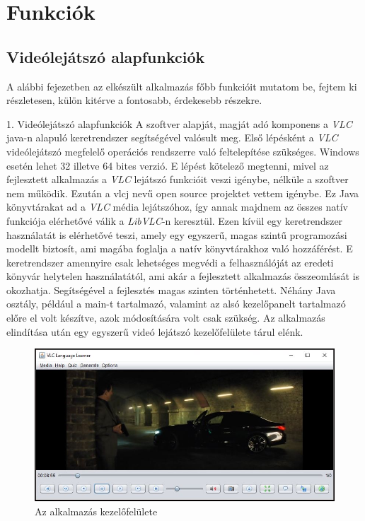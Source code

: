 \chapter{Funkciók}

\section{Videólejátszó alapfunkciók}
A alábbi fejezetben az elkészült alkalmazás főbb funkcióit mutatom be, fejtem ki részletesen, külön kitérve a fontosabb, érdekesebb részekre.

1. Videólejátszó alapfunkciók
A szoftver alapját, magját adó komponens a \textit{VLC} java-n alapuló keretrendszer segítségével valósult meg. Első lépésként a \textit{VLC} videólejátszó megfelelő operációs rendszerre való feltelepítése szükséges. Windows esetén lehet 32 illetve 64 bites verzió. E lépést kötelező megtenni, mivel az fejlesztett alkalmazás a \textit{VLC} lejátszó funkcióit veszi igénybe, nélküle a szoftver nem működik. Ezután a vlcj nevű open source projektet vettem igénybe. Ez Java könyvtárakat ad a \textit{VLC} média lejátszóhoz, így annak majdnem az összes natív funkciója elérhetővé válik a \textit{LibVLC}-n keresztül. Ezen kívül egy keretrendszer használatát is elérhetővé teszi, amely egy egyszerű, magas szintű programozási modellt biztosít, ami magába foglalja a natív könyvtárakhoz való hozzáférést. E keretrendszer amennyire csak lehetséges megvédi a felhasználóját az eredeti könyvár helytelen használatától, ami akár a fejlesztett alkalmazás összeomlását is okozhatja. Segítségével a fejlesztés magas szinten történhetett. Néhány Java osztály, például a main-t tartalmazó, valamint az alsó kezelőpanelt tartalmazó előre el volt készítve, azok módosítására volt csak szükség. Az alkalmazás elindítása után egy egyszerű videó lejátszó kezelőfelülete tárul elénk.
  
\begin{figure}
  \includegraphics[width=\linewidth]{images/main_screen.jpg}
  \caption{Az alkalmazás kezelőfelülete}
  \label{fig:main_screen}
\end{figure}

